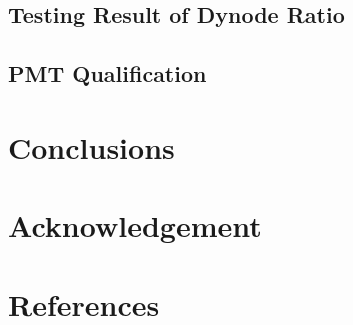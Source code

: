 \documentclass[preprint,5p,times]{elsarticle}
\begin{document}
\subsection{Testing Result of Dynode Ratio}
\label{sec:dynode_ratio}

\subsection{PMT Qualification}
\label{sec:qualification}

\section{Conclusions}
\label{sec:conclustions}

\section*{Acknowledgement}

\appendix
\section{}
\label{app:}

\section*{References}

\end{document}
